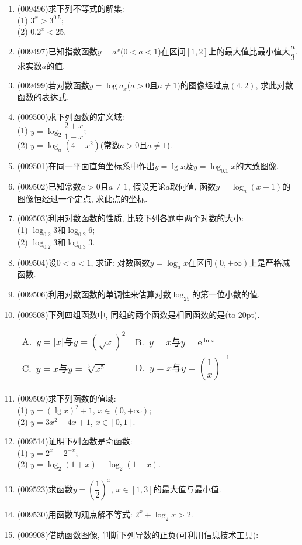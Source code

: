 \documentclass[10pt,a4paper]{article}
\newcommand{\bracket}[1]{(\hbox to #1pt{})}
\newcommand{\twoch}[4]{\par\begin{tabular}{p{.46\textwidth}p{.46\textwidth}}
A.~#1& B.~#2\\
C.~#3& D.~#4
\end{tabular}}
\begin{document}
\begin{enumerate}[1.]
\item {\tiny (009496)}求下列不等式的解集:\\
(1) $3^x>3^{0.5}$;\\
(2) $0.2^x<25$.
\item {\tiny (009497)}已知指数函数$y=a^x$($0<a<1$)在区间$[1, 2]$上的最大值比最小值大$\dfrac a3$, 求实数$a$的值.
\item {\tiny (009499)}若对数函数$y=\log a_x$($a>0$且$a\ne 1$)的图像经过点$(4, 2)$, 求此对数函数的表达式.
\item {\tiny (009500)}求下列函数的定义域:\\
(1) $y=\log_2\dfrac{2+x}{1-x}$;\\
(2) $y=\log_a(4-x^2)$(常数$a>0$且$a\ne 1$).
\item {\tiny (009501)}在同一平面直角坐标系中作出$y=\lg x$及$y=\log_{0.1}x$的大致图像.
\item {\tiny (009502)}已知常数$a>0$且$a\ne 1$, 假设无论$a$取何值, 函数$y=\log_a(x-1)$的图像恒经过一个定点, 求此点的坐标.
\item {\tiny (009503)}利用对数函数的性质, 比较下列各题中两个对数的大小:\\
(1) $\log_{0.2}3$和$\log_{0.2}6$;\\
(2) $\log_{0.2}3$和$\log_{0.3}3$.
\item {\tiny (009504)}设$0<a<1$, 求证: 对数函数$y=\log_ax$在区间$(0, +\infty)$上是严格减函数.
\item {\tiny (009506)}利用对数函数的单调性来估算对数$\log_25$的第一位小数的值.
\item {\tiny (009508)}下列四组函数中, 同组的两个函数是相同函数的是\bracket{20}.
\twoch{$y=|x|$与$y=(\sqrt x)^2$}{$y=x$与$y=\mathrm{e}^{\ln x}$}{$y=x$与$y=\sqrt[5]{x^5}$}{$y=x$与$y=(\dfrac 1x)^{-1}$}
\item {\tiny (009509)}求下列函数的值域:\\
(1) $y=(\lg x)^2+1$, $x\in (0, +\infty)$;\\
(2) $y=3x^2-4x+1$, $x\in [0, 1]$.
\item {\tiny (009514)}证明下列函数是奇函数:\\
(1) $y=2^x-2^{-x}$;\\
(2) $y=\log_2(1+x)-\log_2(1-x)$.
\item {\tiny (009523)}求函数$y=(\dfrac 12)^x$, $x\in [1, 3]$的最大值与最小值.
\item {\tiny (009530)}用函数的观点解不等式: $2^x+\log_2x>2$.
\item {\tiny (009908)}借助函数图像, 判断下列导数的正负(可利用信息技术工具):\\

\end{enumerate}
\end{document}

